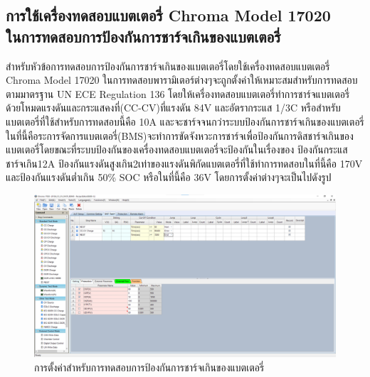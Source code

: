 \subsection{การใช้เครื่องทดสอบแบตเตอรี่ Chroma Model 17020 \\ ในการทดสอบการป้องกันการชาร์จเกินของแบตเตอรี่}
สำหรับหัวข้อการทดสอบการป้องกันการชาร์จเกินของแบตเตอรี่โดยใช้เครื่องทดสอบแบตเตอรี่ Chroma Model 17020 ในการทดสอบพารามิเตอร์ต่างๆจะถูกตั้งค่าให้เหมาะสมสำหรับการทดสอบตามมาตรฐาน UN ECE Regulation 136 โดยให้เครื่องทดสอบแบตเตอรี่ทำการชาร์จแบตเตอรี่ด้วยโหมดแรงดันและกระแสคงที่(CC-CV)ที่แรงดัน 84V และอัตรากระแส 1/3C หรือสำหรับแบตเตอรี่ที่ใช้สำหรับการทดสอบนี้คือ 10A
และจะชาร์จจนกว่าระบบป้องกันการชาร์จเกินของแบตเตอรี่ในที่นี้คือระการจัดการแบตเตอรี่(BMS)จะทำการขัดจังหวะการชาร์จเพื่อป้องกันการดิสชาร์จเกินของแบตเตอรี่โดยขณะที่ระบบป้องกันของเครื่องทดสอบแบตเตอรี่จะป้องกันในเรื่องของ
ป้องกันกระแสชาร์จเกิน12A ป้องกันแรงดันสูงเกิน2เท่าของแรงดันพิกัดแบตเตอรี่ที่ใช้ทำการทดสอบในที่นี้คือ 170V และป้องกันแรงดันต่ำเกิน 50\% SOC หรือในที่นี้คือ 36V โดยการตั้งค่าต่างๆจะเป็นไปดังรูป
\begin{center}
	\begin{figure}[H]
		\includegraphics[width=1\linewidth]{Chapters/img/R136_DEMO/UUT_TEST_OVCP.png}
		\centering
		\captionsetup{justification=centering,margin=2cm}
		\caption{การตั้งค่าสำหรับการทดสอบการป้องกันการชาร์จเกินของแบตเตอรี่}
	\end{figure}
\end{center}

